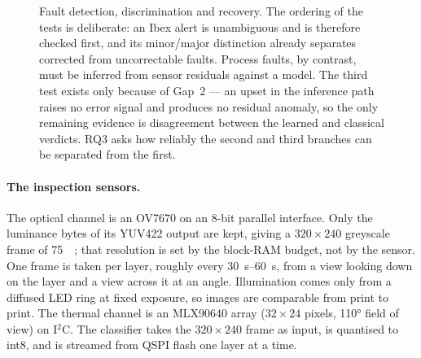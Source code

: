 \documentclass[11pt,a4paper]{article}
\begin{document}
\begin{figure}[htbp]
{}
\caption{Fault detection, discrimination and recovery. The ordering of the tests
is deliberate: an Ibex alert is unambiguous and is therefore checked first, and
its minor/major distinction already separates corrected from uncorrectable
faults. Process faults, by contrast, must be inferred from sensor residuals
against a model. The third test exists only because of Gap~2 --- an upset in the
inference path raises no error signal and produces no residual anomaly, so the
only remaining evidence is disagreement between the learned and classical
verdicts. RQ3 asks how reliably the second and third branches can be separated
from the first.}
\label{fig:fdir}
\end{figure}

\paragraph{The inspection sensors.}
The optical channel is an OV7670 on an 8-bit parallel interface. Only the
luminance bytes of its YUV422 output are kept, giving a \(320\times240\)
greyscale frame of \SI{75}{\kilo\byte}; that resolution is set by the block-RAM
budget, not by the sensor. One frame is taken per layer, roughly every
\SIrange{30}{60}{\second}, from a view looking down on the layer and a view
across it at an angle. Illumination comes only from a diffused LED ring at fixed
exposure, so images are comparable from print to print. The thermal channel is an
MLX90640 array (\(32\times24\) pixels, \ang{110} field of view) on I\(^2\)C.
The classifier takes the \(320\times240\) frame as input, is quantised to int8,
and is streamed from QSPI flash one layer at a time.
\end{document}
